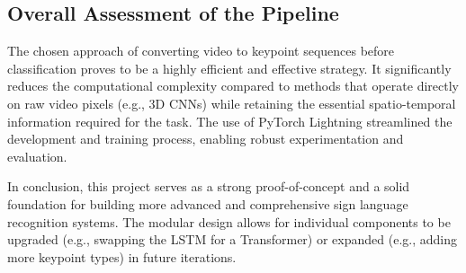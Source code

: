 \documentclass[11pt, a4paper]{article}
\begin{document}
\subsection{Overall Assessment of the Pipeline}
The chosen approach of converting video to keypoint sequences before classification proves to be a highly efficient and effective strategy. It significantly reduces the computational complexity compared to methods that operate directly on raw video pixels (e.g., 3D CNNs) while retaining the essential spatio-temporal information required for the task. The use of PyTorch Lightning streamlined the development and training process, enabling robust experimentation and evaluation.

In conclusion, this project serves as a strong proof-of-concept and a solid foundation for building more advanced and comprehensive sign language recognition systems. The modular design allows for individual components to be upgraded (e.g., swapping the LSTM for a Transformer) or expanded (e.g., adding more keypoint types) in future iterations.

\appendix
\end{document}
